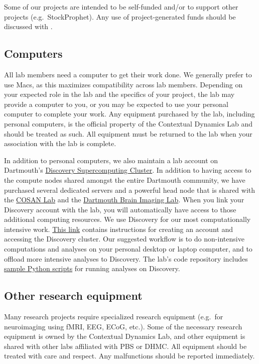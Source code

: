 \documentclass{tufte-book} %
\begin{document}
 Some of our projects are intended to be self-funded and/or to support
 other projects (e.g.\ StockProphet).  Any use of project-generated
 funds should be discussed with \director.

 \subsection{Computers}

 All lab members need a computer to get their work done.  We generally
 prefer to use Macs, as this maximizes compatibility across lab
 members.  Depending on your expected role in the lab and the
 specifics of your project, the lab may provide a computer to you, or
 you may be expected to use your personal computer to complete your
 work.  Any equipment purchased by the lab, including personal
 computers, is the official property of the Contextual Dynamics Lab
 and should be treated as such.  All equipment must be returned to the
 lab when your association with the lab is complete.

 In addition to personal computers, we also maintain a lab account on
 Dartmouth's \href{http://techdoc.dartmouth.edu/discovery/}{Discovery
   Supercomputing Cluster}.  In addition to having access to the
 compute nodes shared amongst the entire Dartmouth community, we have
 purchased several dedicated servers and a powerful head node that is
 shared with the \href{http://www.cosanlab.com/}{COSAN Lab} and the
 \href{http://www.dartmouth.edu/~bil/}{Dartmouth Brain Imaging Lab}.
 When you link your Discovery account with the lab, you will
 automatically have access to those additional computing resources.
 We use Discovery for our most computationally intensive work.
 \href{https://rc.dartmouth.edu/index.php/discovery-overview/accessing-the-cluster}{This
   link} contains instructions for creating an account and
 accessing the Discovery cluster.  Our suggested workflow is to do non-intensive
 computations and analyses on your personal desktop or laptop
 computer, and to offload more intensive analyses to Discovery.  The
 lab's code repository includes
 \href{https://github.com/ContextLab/cluster-tools-dartmouth}{sample
   Python scripts} for running analyses on Discovery.

 \subsection{Other research equipment}
 Many research projects require specialized research equipment (e.g.\
 for neuroimaging using fMRI, EEG, ECoG, etc.).  Some of the necessary
 research equipment is owned by the Contextual Dynamics Lab, and other
 equipment is shared with other labs affiliated with PBS or DHMC.  All
 equipment should be treated with care and respect.  Any malfunctions
 should be reported immediately.
\end{document}

